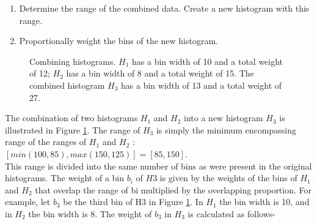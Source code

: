 \documentclass[10pt]{report}          %
\begin{document}
\begin{enumerate}
\item Determine the range of the combined data. Create a new histogram with this range.
\item Proportionally weight the bins of the new histogram.
\end{enumerate}

\begin{figure}[h]
\begin{center}
\caption{Combining histograms. $H_1$ has a bin width of 10
and a total weight of 12; $H_2$ has a bin width of 8 and a total
weight of 15. The combined histogram $H_3$ has a bin width
of 13 and a total weight of 27.
}
\end{center}
\label{fig:hist}
\end{figure}

The combination of two histograms $H_1$ and $H_2$ into a new histogram $H_3$ is illustrated in Figure \ref{fig:hist}. The range of $H_3$ is simply the minimum encompassing range of the ranges of $H_1$ and $H_2$ : $[min(100, 85), max(150, 125)] = [85, 150]$.
\\
This range is divided into the same number of bins as were present in the original histograms. The weight of a bin $b_i$ of $H3$ is given by the weights of the bins of $H_1$ and $H_2$ that overlap the range of bi multiplied by the overlapping proportion. For example, let $b_3$ be the third bin of H3 in
Figure \ref{fig:hist}. In $H_1$ the bin width is 10, and in $H_2$ the bin width
is 8. The weight of $b_3$ in $H_3$ is calculated as follows-
\end{document}
